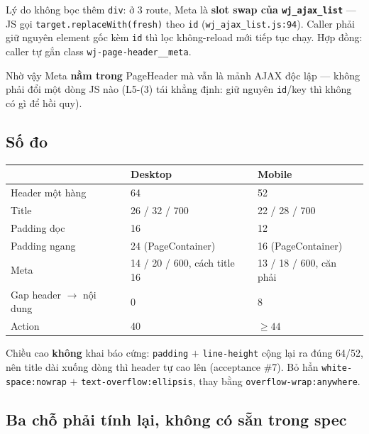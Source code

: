 Lý do không bọc thêm \texttt{div}: ở 3 route, Meta là \textbf{slot swap của
\texttt{wj\_ajax\_list}} --- JS gọi \texttt{target.replaceWith(fresh)} theo \texttt{id}
(\texttt{wj\_ajax\_list.js:94}). Caller phải giữ nguyên element gốc kèm \texttt{id} thì lọc
không-reload mới tiếp tục chạy. Hợp đồng: caller tự gắn class
\texttt{wj-page-header\_\_meta}.

Nhờ vậy Meta \textbf{nằm trong} PageHeader mà vẫn là mảnh AJAX độc lập --- không phải đổi một
dòng JS nào (L5-(3) tái khẳng định: giữ nguyên \texttt{id}/key thì không có gì để hồi quy).

\subsection{Số đo}

\begin{center}
\begin{tabular}{lll}
\hline
& Desktop & Mobile \\
\hline
Header một hàng & 64 & 52 \\
Title & 26 / 32 / 700 & 22 / 28 / 700 \\
Padding dọc & 16 & 12 \\
Padding ngang & 24 (PageContainer) & 16 (PageContainer) \\
Meta & 14 / 20 / 600, cách title 16 & 13 / 18 / 600, căn phải \\
Gap header $\rightarrow$ nội dung & 0 & 8 \\
Action & 40 & $\geq 44$ \\
\hline
\end{tabular}
\end{center}

Chiều cao \textbf{không} khai báo cứng: \texttt{padding} $+$ \texttt{line-height} cộng lại ra
đúng 64/52, nên title dài xuống dòng thì header tự cao lên (acceptance \#7). Bỏ hẳn
\texttt{white-space:nowrap} $+$ \texttt{text-overflow:ellipsis}, thay bằng
\texttt{overflow-wrap:anywhere}.

\subsection{Ba chỗ phải tính lại, không có sẵn trong spec}

